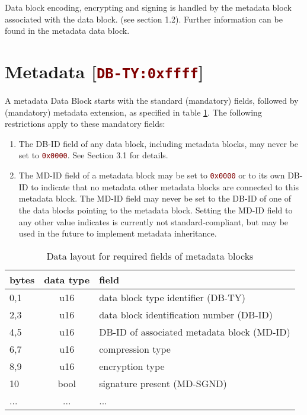 \documentclass[pagesize=a4]{tufte-book}
\newcommand{\hlred}[1]{\textcolor{Maroon}{#1}}%
\newcommand{\hex}[1]{\hlred{\texttt{#1}}}%
\begin{document}
Data block encoding, encrypting and signing is handled by the metadata block
associated with the data block. (see section 1.2). Further information can be
found in the metadata data block.

\section{Metadata [\hex{DB-TY:0xffff}]}
\label{DBTY:0xffff}
A metadata Data Block starts with the standard (mandatory) fields, followed by (mandatory) metadata extension, as specified in table \ref{tab:metadata_fields}. The following restrictions apply to these mandatory fields:
\begin{enumerate}
	\item The DB-ID field of any data block, including metadata blocks, may never be set to \hex{0x0000}. See Section 3.1 for details.
	\item The MD-ID field of a metadata block may be set to \hex{0x0000} or to its own DB-ID to indicate that no metadata other metadata blocks are connected to this metadata block. The MD-ID field may never be set to the DB-ID of one of the data blocks pointing to the metadata block. Setting the MD-ID field to	any other value indicates is currently not standard-compliant, but may be used in the future to implement metadata inheritance.
\end{enumerate}

\begin{table}[ht]
	\centering
	\selectfont
	\begin{tabular}{lcl}
		\toprule
		bytes & data type & field\\
		\midrule
		0,1 & u16 & data block type identifier (DB-TY)\\
		2,3 & u16 & data block identification number (DB-ID)\\
		4,5 & u16 & DB-ID of associated metadata block (MD-ID)\\
		6,7 & u16 & compression type\\
		8,9 & u16 & encryption type\\
		10 & bool & signature present (MD-SGND)\\
		... & ... & ...\\
		\bottomrule
	\end{tabular}
	~\label{tab:metadata_fields}
	\caption{Data layout for required fields of metadata blocks}	
\end{table}
\vspace{5mm}
\end{document}

